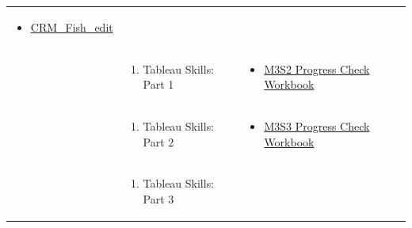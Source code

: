 \documentclass[
]{book}
\providecommand{\tightlist}{%
  \setlength{\itemsep}{0pt}\setlength{\parskip}{0pt}}
\begin{document}
\begin{longtable}[]{@{}lll@{}}
\begin{minipage}[t]{0.42\columnwidth}
\begin{itemize}
\tightlist
\item
  \href{files/CRM_Fish_edit.xlsx}{CRM\_Fish\_edit}
\end{itemize}\strut
\end{minipage}\tabularnewline
\begin{minipage}[t]{0.15\columnwidth}\raggedright
\strut
\end{minipage} & \begin{minipage}[t]{0.34\columnwidth}\raggedright
\begin{enumerate}
\def\labelenumi{\arabic{enumi}.}
\setcounter{enumi}{1}
\tightlist
\item
  Tableau Skills: Part 1
\end{enumerate}\strut
\end{minipage} & \begin{minipage}[t]{0.42\columnwidth}\raggedright
\begin{itemize}
\tightlist
\item
  \href{files/M3S2_exercise_key.twbx}{M3S2 Progress Check Workbook}
\end{itemize}\strut
\end{minipage}\tabularnewline
\begin{minipage}[t]{0.15\columnwidth}\raggedright
\strut
\end{minipage} & \begin{minipage}[t]{0.34\columnwidth}\raggedright
\begin{enumerate}
\def\labelenumi{\arabic{enumi}.}
\setcounter{enumi}{2}
\tightlist
\item
  Tableau Skills: Part 2
\end{enumerate}\strut
\end{minipage} & \begin{minipage}[t]{0.42\columnwidth}\raggedright
\begin{itemize}
\tightlist
\item
  \href{files/M3S3_exercise_key.twbx}{M3S3 Progress Check Workbook}
\end{itemize}\strut
\end{minipage}\tabularnewline
\begin{minipage}[t]{0.15\columnwidth}\raggedright
\strut
\end{minipage} & \begin{minipage}[t]{0.34\columnwidth}\raggedright
\begin{enumerate}
\def\labelenumi{\arabic{enumi}.}
\setcounter{enumi}{3}
\tightlist
\item
  Tableau Skills: Part 3
\end{enumerate}\strut

\end{minipage}
\end{longtable}
\end{document}
